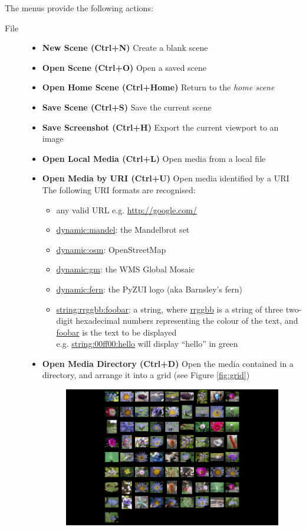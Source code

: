 \documentclass{report}
\begin{document}
  The menus provide the following actions:
  \begin{description}
    \item[File]
    \begin{itemize}
      \item \textbf{New Scene (Ctrl+N)} Create a blank scene
      \item \textbf{Open Scene (Ctrl+O)} Open a saved scene
      \item \textbf{Open Home Scene (Ctrl+Home)}
            Return to the \emph{home scene}
      \item \textbf{Save Scene (Ctrl+S)} Save the current scene
      \item \textbf{Save Screenshot (Ctrl+H)}
            Export the current viewport to an image
      \item \textbf{Open Local Media (Ctrl+L)} Open media from a local file
      \item \textbf{Open Media by URI (Ctrl+U)}
            Open media identified by a URI \\
            The following URI formats are recognised:
            \begin{itemize}
              \item any valid URL e.g. \url{http://google.com/}
              \item \url{dynamic:mandel}: the Mandelbrot set
              \item \url{dynamic:osm}: OpenStreetMap
              \item \url{dynamic:gm}: the WMS Global Mosaic
              \item \url{dynamic:fern}: the PyZUI logo (aka Barnsley's fern)
              \item \url{string:rrggbb:foobar}:
                    a string, where \url{rrggbb} is a string of three two-digit
                    hexadecimal numbers representing the colour of the text,
                    and \url{foobar} is the text to be displayed \\
                    e.g. \url{string:00ff00:hello} will display ``hello'' in
                    green
            \end{itemize}
      \item \textbf{Open Media Directory (Ctrl+D)}
            Open the media contained in a directory, and arrange it into a grid
            (see Figure \ref{fig:grid})
            \begin{figure}[h!]
            \begin{center}
              \includegraphics[width=10cm]{../images/grid.png}

\end{center}
\end{figure}
\end{itemize}
\end{description}
\end{document}
